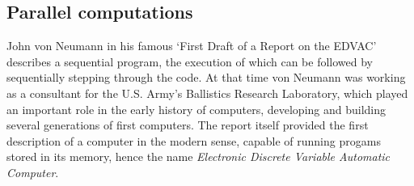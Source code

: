 \subsection{Parallel computations}

John von Neumann in his famous `First Draft of a Report on the EDVAC' \citep{vonNeumann1945} describes a sequential program, the execution of which can be followed by sequentially stepping through the code.
%
%
At that time von Neumann was working as a consultant for the U.S. Army's Ballistics Research Laboratory, which played an important role in the early history of computers, developing and building several generations of first computers.
The report itself provided the first description of a computer in the modern sense, capable of running progams stored in its memory, hence the name \textit{Electronic Discrete Variable Automatic Computer}.

